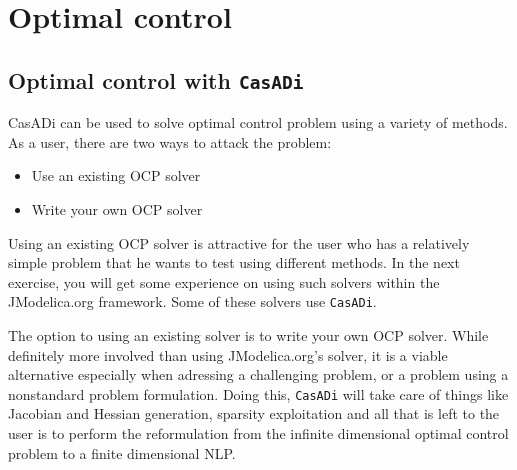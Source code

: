 \documentclass[a4paper,12pt]{book}
\newcommand{\CasADi}{\texttt{CasADi}\xspace}
\begin{document}
\chapter{Optimal control}

\section{Optimal control with \CasADi}
CasADi can be used to solve optimal control problem using a variety of methods. As a user, there are two ways to attack the problem:
\begin{itemize}
  \item Use an existing OCP solver
  \item Write your own OCP solver
\end{itemize}

Using an existing OCP solver is attractive for the user who has a relatively simple problem that he wants to test using different methods. In the next exercise, you will get some experience on using such solvers within the JModelica.org framework. Some of these solvers use \CasADi.

The option to using an existing solver is to write your own OCP solver. While definitely more involved than using JModelica.org's solver, it is a viable alternative especially when adressing a challenging problem, or a problem using a nonstandard problem formulation. Doing this,   \CasADi will take care of things like Jacobian and Hessian generation, sparsity exploitation and all that is left to the user is to perform the reformulation from the infinite dimensional optimal control problem to a finite dimensional NLP.
\end{document}
